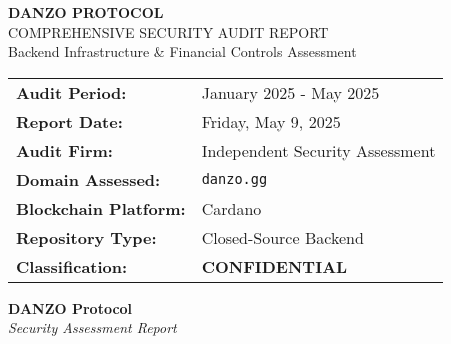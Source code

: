 \documentclass[11pt,a4paper]{article}
\begin{document}
\begin{titlepage}
    \centering
    \vspace*{1cm}
    
    {\Huge\bfseries\color{danzoBlue} DANZO PROTOCOL}\\[0.5cm]
    {\LARGE\color{danzoGray} COMPREHENSIVE SECURITY AUDIT REPORT}\\[1.5cm]
    
    {\large Backend Infrastructure \& Financial Controls Assessment}\\[2cm]
    
    \begin{tabular}{p{4cm}p{6cm}}
        \textbf{Audit Period:} & January 2025 - May 2025 \\[0.3cm]
        \textbf{Report Date:} & Friday, May 9, 2025 \\[0.3cm]
        \textbf{Audit Firm:} & Independent Security Assessment \\[0.3cm]
        \textbf{Domain Assessed:} & \texttt{danzo.gg} \\[0.3cm]
        \textbf{Blockchain Platform:} & Cardano \\[0.3cm]
        \textbf{Repository Type:} & Closed-Source Backend \\[0.3cm]
        \textbf{Classification:} & \textcolor{danzoRed}{\textbf{CONFIDENTIAL}} \\[0.3cm]
    \end{tabular}
    
    \vfill
    
    \begin{center}
    \end{center}
    
    \vspace{1cm}
    
    {\large\textbf{DANZO Protocol}}\\
    {\textit{Security Assessment Report}}
    
\end{titlepage}

\tableofcontents
\newpage
\end{document}
